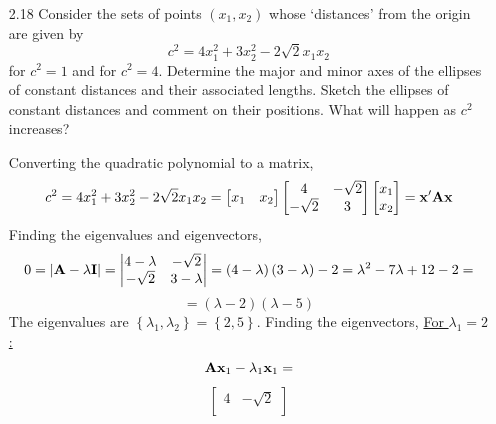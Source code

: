 \begin{enumerate}[font=\bfseries]
        \item[2.18] Consider the sets of points $\left(x_1, x_2\right)$ whose `distances' from the origin are given by
        \[
            c^2 = 4x_1^2 + 3x_2^2 - 2\sqrt{2}x_1x_2
        \]
        for $c^2 = 1$ and for $c^2 = 4$. Determine the major and minor axes of the ellipses of constant
        distances and their associated lengths. Sketch the ellipses of constant distances and
        comment on their positions. What will happen as $c^2$ increases?
        \par
        Converting the quadratic polynomial to a matrix,
        \[
            c^2 = 4x_1^2 + 3x_2^2 - 2\sqrt{2}x_1x_2
            =
            \begin{bmatrix}
                x_1 & x_2
            \end{bmatrix}
            \begin{bmatrix}
                4 & -\sqrt{2} \\
                -\sqrt{2} & 3
            \end{bmatrix}
            \begin{bmatrix}
                x_1 \\
                x_2
            \end{bmatrix}
            =
            \bold{x}^\prime\bold{A}\bold{x}
        \]
        Finding the eigenvalues and eigenvectors,
        \[
            0 = \left|\bold{A} - \lambda\bold{I}\right|
            =
            \left|
            \begin{matrix}
                4-\lambda & -\sqrt{2} \\
                -\sqrt{2} & 3-\lambda
            \end{matrix}
            \right|
            =
            \left(4-\lambda\right)\left(3-\lambda\right) - 2
            =
            \lambda^2 -7\lambda + 12 - 2 
            =
        \]
        \[
            =
            \left(\lambda-2\right)\left(\lambda-5\right)
        \]
        The eigenvalues are $\left\{\lambda_1, \lambda_2\right\} = \left\{2, 5\right\}$.
        Finding the eigenvectors,
        \newline
        \underline{For $\lambda_1 = 2$:}
        \[
            \bold{A}\bold{x}_1 - \lambda_1\bold{x}_1
            =
        \]
        \[
            \begin{bmatrix}
                4 & -\sqrt{2} \\

\end{bmatrix}\]
\end{enumerate}
